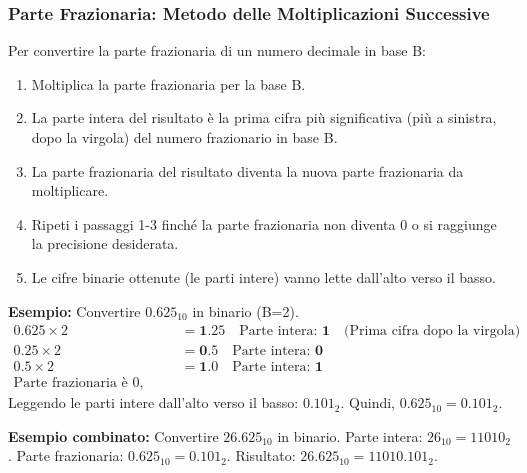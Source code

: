 \subsubsection{Parte Frazionaria: Metodo delle Moltiplicazioni Successive}
Per convertire la parte frazionaria di un numero decimale in base B:
\begin{enumerate}
    \item Moltiplica la parte frazionaria per la base B.
    \item La parte intera del risultato è la prima cifra più significativa (più a sinistra, dopo la virgola) del numero frazionario in base B.
    \item La parte frazionaria del risultato diventa la nuova parte frazionaria da moltiplicare.
    \item Ripeti i passaggi 1-3 finché la parte frazionaria non diventa 0 o si raggiunge la precisione desiderata.
    \item Le cifre binarie ottenute (le parti intere) vanno lette dall'alto verso il basso.
\end{enumerate}
\textbf{Esempio:} Convertire $0.625_{10}$ in binario (B=2).
\begin{align*} 0.625 \times 2 &= \mathbf{1}.25 \quad \text{Parte intera: } \mathbf{1} \quad \text{(Prima cifra dopo la virgola)} \\ 0.25 \times 2  &= \mathbf{0}.5   \quad \text{Parte intera: } \mathbf{0} \\ 0.5 \times 2   &= \mathbf{1}.0   \quad \text{Parte intera: } \mathbf{1} \\ \text{Parte frazionaria è 0, stop.} \end{align*}
Leggendo le parti intere dall'alto verso il basso: $0.101_2$.
Quindi, $0.625_{10} = 0.101_2$.

\textbf{Esempio combinato:} Convertire $26.625_{10}$ in binario.
Parte intera: $26_{10} = 11010_2$.
Parte frazionaria: $0.625_{10} = 0.101_2$.
Risultato: $26.625_{10} = 11010.101_2$.

